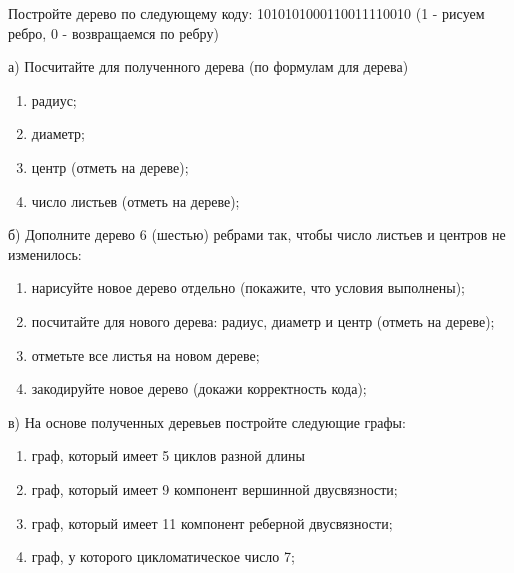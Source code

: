 \question 
Постройте дерево по следующему коду: 1010101000110011110010 (1 - рисуем ребро, 0 - возвращаемся по ребру)

а) Посчитайте для полученного дерева (по формулам для дерева)
\begin{enumerate}
\item радиус;
\item диаметр;
\item центр (отметь на дереве);
\item число листьев (отметь на дереве);
\end{enumerate}

б) Дополните дерево 6 (шестью) ребрами так, чтобы число листьев и центров не изменилось:
\begin{enumerate}
\item нарисуйте новое дерево отдельно (покажите, что условия выполнены);
\item посчитайте для нового дерева: радиус, диаметр и центр (отметь на дереве);
\item отметьте все листья на  новом дереве;
\item закодируйте новое дерево (докажи корректность кода);
\end{enumerate}

в) На основе полученных деревьев  постройте следующие графы:
\begin{enumerate}
\item граф, который имеет 5 циклов разной длины
\item граф, который имеет 9 компонент вершинной двусвязности;
\item граф, который имеет 11 компонент реберной двусвязности;
\item граф, у которого цикломатическое число 7;
\end{enumerate}